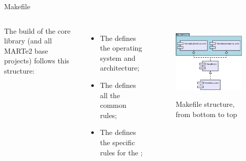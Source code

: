 \begin{frame}{Makefile}
	\begin{columns}
		The build of the core library (and all MARTe2 base projects) follows this structure:
		\begin{itemize}
			\item<1-> The  defines the  operating system and architecture;
			\item<2-> The  defines all the common rules;
			\item<3-> The  defines the specific rules for the ;
		\end{itemize}
		\begin{figure}
			\centering
			\includegraphics[scale=.3]{Makefiles.png}
			\label{fig:makefiles}
			\caption{Makefile structure, \\ from bottom to top}
		\end{figure}
	\end{columns}
\end{frame}
